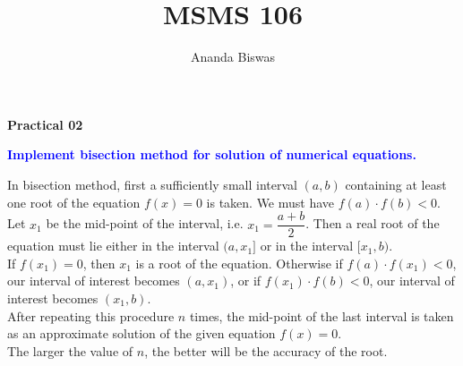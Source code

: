 \documentclass[11pt, a4paper]{article}\usepackage[]{graphicx}\usepackage[]{xcolor}
\title{MSMS 106}
\author{Ananda Biswas}
\date{}
\begin{document}
\maketitle

\begin{center}
\textbf{Practical 02}
\end{center}

\smallpencil \hspace{0.5cm} \textcolor{blue}{\textbf{Implement bisection method for solution of numerical equations.}}

\vspace{0.5cm}

\faArrowAltCircleRight[regular] \hspace{0.5cm} In bisection method, first a sufficiently small interval $(a, b)$ containing at least one root of the equation $f(x) = 0$ is taken. We must have $f(a) \cdot f(b) < 0$. \\

\hspace{0.5cm} Let $x_1$ be the mid-point of the interval, i.e. $x_1 = \dfrac{a + b}{2}$. Then a real root of the equation must lie either in the interval $(a, x_1]$ or in the interval $[x_1, b)$. \\

\hspace{0.5cm} If $f(x_1) = 0$, then $x_1$ is a root of the equation. Otherwise if $f(a) \cdot f(x_1) < 0$, our interval of interest becomes $(a, x_1)$, or if $f(x_1) \cdot f(b) < 0$, our interval of interest becomes $(x_1, b)$. \\

\hspace{0.5cm} After repeating this procedure $n$ times, the mid-point of the last interval is taken as an approximate solution of the given equation $f(x) = 0$. \\

\hspace{0.5cm} The larger the value of $n$, the better will be the accuracy of the root.
\end{document}
